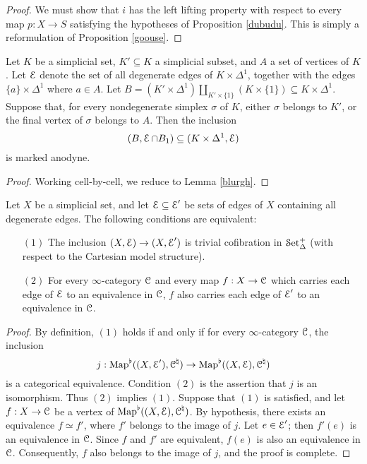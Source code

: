 \begin{proof}
We must show that $i$ has the left lifting property with respect to every map $p: X \rightarrow S$ satisfying the hypotheses of Proposition \ref{dubudu}. This is simply a reformulation of Proposition \ref{goouse}.
\end{proof}

\begin{lemma}\label{blughel}
Let $K$ be a simplicial set, $K' \subseteq K$ a simplicial subset, and $A$ a set of vertices of $K$.
Let $\operatorname{\mathcal{E}}$ denote the set of all degenerate edges of $K \times \Delta^1$, together with the edges
$\{a\} \times \Delta^1$ where $a \in A$. Let $B = (K' \times \Delta^1) \coprod_{ K' \times \{1\} } (K \times \{1\}) \subseteq K \times \Delta^1$. Suppose that, for every nondegenerate simplex $\sigma$ of $K$, either $\sigma$ belongs to $K'$, or the final vertex of $\sigma$ belongs to $A$. Then the inclusion
$$ (B, \operatorname{\mathcal{E}} \cap B_1) \subseteq (K \times \Delta^1, \operatorname{\mathcal{E}})$$ is marked anodyne.
\end{lemma}

\begin{proof}
Working cell-by-cell, we reduce to Lemma \ref{blurgh}.
\end{proof}

\begin{lemma}\label{brend}
Let $X$ be a simplicial set, and let $\operatorname{\mathcal{E}} \subseteq \operatorname{\mathcal{E}}'$ be sets of edges of $X$ containing all degenerate edges. The following conditions are equivalent:
\begin{itemize}
\item[$(1)$] The inclusion $(X, \operatorname{\mathcal{E}}) \rightarrow (X, \operatorname{\mathcal{E}}')$ is trivial cofibration in $\operatorname{\mathcal{S}et_{\Delta}^{+}}$ (with respect to the Cartesian model structure). 
\item[$(2)$] For every $\infty$-category $\operatorname{\mathcal{C}}$ and every map $f: X \rightarrow \operatorname{\mathcal{C}}$ which carries each edge of
$\operatorname{\mathcal{E}}$ to an equivalence in $\operatorname{\mathcal{C}}$, $f$ also carries each edge of $\operatorname{\mathcal{E}}'$ to an equivalence in $\operatorname{\mathcal{C}}$.
\end{itemize}
\end{lemma}

\begin{proof}
By definition, $(1)$ holds if and only if for every $\infty$-category $\operatorname{\mathcal{C}}$, the inclusion
$$j: \operatorname{{Map}}^{\flat}( (X, \operatorname{\mathcal{E}}'), \operatorname{\mathcal{C}}^{\natural}) \rightarrow \operatorname{{Map}}^{\flat}( (X, \operatorname{\mathcal{E}}), \operatorname{\mathcal{C}}^{\natural} )$$ is a categorical equivalence. Condition $(2)$ is the assertion that $j$ is an isomorphism. Thus $(2)$ implies $(1)$. Suppose that $(1)$ is satisfied, and let $f: X \rightarrow \operatorname{\mathcal{C}}$ be a vertex of
$\operatorname{{Map}}^{\flat}((X,\operatorname{\mathcal{E}}), \operatorname{\mathcal{C}}^{\natural})$. By hypothesis, there exists an equivalence $f \simeq f'$, where $f'$ belongs to the image of $j$. Let $e \in \operatorname{\mathcal{E}}'$; then $f'(e)$ is an equivalence in $\operatorname{\mathcal{C}}$. Since $f$ and $f'$ are equivalent, $f(e)$ is also an equivalence in $\operatorname{\mathcal{C}}$. Consequently, $f$ also belongs to the image of $j$, and the proof is complete.
\end{proof}

